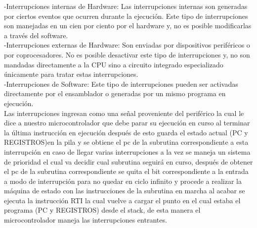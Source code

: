 \documentclass[a4paper]{article}
\begin{document}
-Interrupciones internas de Hardware:
Las interrupciones internas son generadas por ciertos eventos que
ocurren durante la ejecución. Este tipo de interrupciones son manejadas
en un cien por ciento  por el hardware y, no es posible modificarlas a
través del software. \\

-Interrupciones externas de Hardware:
Son enviadas por dispositivos periféricos o por coprocesadores. No es
posible desactivar este tipo de interrupciones y, no son mandadas
directamente a la CPU sino a circuito integrado especializado únicamente para tratar estas interrupciones.\\

-Interrupciones de Software:
Este tipo de interrupciones pueden ser activadas directamente por el ensamblador o generadas por un mismo programa en ejecución.\\

Las interrupciones ingresan como una señal proveniente del periférico la
cual le dice a nuestro microcontrolador que debe parar su ejecución en
curso al terminar la última instrucción en ejecución después de esto
guarda el estado actual (PC y REGISTROS)en la pila y se obtiene el pc de
la subrutina correspondiente a esta interrupción en caso de llegar varias
interrupciones a la vez se maneja un sistema de prioridad el cual va
decidir cual subrutina seguirá en curso, después de obtener el pc de la
subrutina correspondiente se quita el bit correspondiente a la entrada a
modo de interrupción para no quedar en ciclo infinito  y procede a
realizar la máquina de estado con las instrucciones de la subrutina en
marcha al acabar se ejecuta la instrucción RTI la cual vuelve a cargar
el punto en el cual estaba el programa (PC y REGISTROS) desde el stack,
de esta manera el microcontrolador maneja las interrupciones entrantes.
\\
\end{document}
